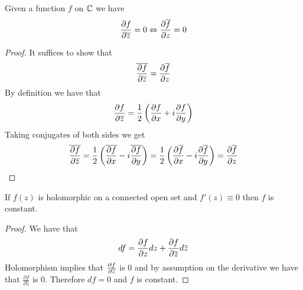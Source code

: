 \begin{proposition}
Given a function $f$ on $\mathbb{C}$ we have
$$ \frac{\partial f}{\partial \overline{z}} = 0 \Leftrightarrow \frac{\partial \overline{f}}{\partial z} = 0 $$
\end{proposition}
\begin{proof}
It suffices to show that 
$$ \overline{\frac{\partial f}{\partial \overline{z}}} = \frac{\partial \overline{f}}{\partial z} $$
By definition we have that 
$$ \frac{\partial f}{\partial \overline{z}} = \frac{1}{2} \left( \frac{\partial f}{\partial x} + i\frac{\partial f}{\partial y} \right) $$
Taking conjugates of both sides we get
$$ \overline{\frac{\partial f}{\partial \overline{z}}} = \frac{1}{2} \left( \overline{\frac{\partial f}{\partial x}} - i \overline{\frac{\partial f}{\partial y}} \right) = \frac{1}{2} \left( \frac{\partial \overline{f}}{\partial x} - i \frac{\partial \overline{f}}{\partial y} \right) = \frac{\partial \overline{f}}{\partial z} $$
\end{proof}
\begin{lemma}
If $f(z)$ is holomorphic on a connected open set and $f'(z) \equiv 0$ then $f$ is constant.
\end{lemma}
\begin{proof}
We have that 
$$ df = \frac{\partial f}{\partial z}dz + \frac{\partial f}{\partial \overline{z}}d \overline{z} $$
Holomorphism implies that $\frac{\partial f}{\partial \overline{z}}$ is 0 and by assumption on the derivative we have that $\frac{\partial f}{\partial z}$ is 0. Therefore $df = 0$ and $f$ is constant.
\end{proof}

